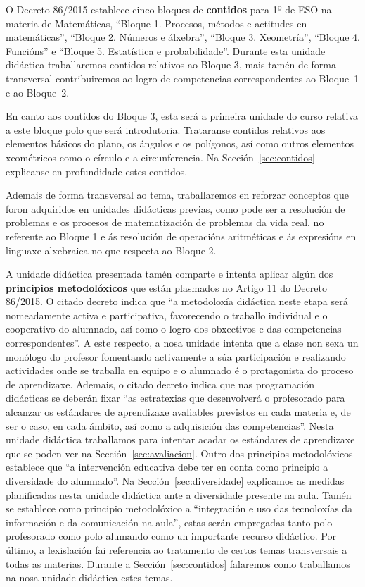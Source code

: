 O Decreto 86/2015 establece cinco bloques de \textbf{contidos} para 1º de ESO na materia de Matemáticas, ``Bloque 1. Procesos, métodos e actitudes en matemáticas'', ``Bloque 2. Números e álxebra'', ``Bloque 3. Xeometría'', ``Bloque 4. Funcións'' e ``Bloque 5. Estatística e probabilidade''. Durante esta unidade didáctica traballaremos contidos relativos ao Bloque 3, mais tamén de forma transversal contribuiremos ao logro de competencias correspondentes ao Bloque~1 e ao Bloque~2.

En canto aos contidos do Bloque 3, esta será a primeira unidade do curso relativa a este bloque polo que será introdutoria. Trataranse contidos relativos aos elementos básicos do plano, os ángulos e os polígonos, así como outros elementos xeométricos como o círculo e a circunferencia. Na Sección~\ref{sec:contidos} explicanse en profundidade estes contidos.

Ademais de forma transversal ao tema, traballaremos en reforzar conceptos que foron adquiridos en unidades didácticas previas, como pode ser a resolución de problemas e os procesos de matematización de problemas da vida real, no referente ao Bloque 1 e ás resolución de operacións aritméticas e ás expresións en linguaxe alxebraica no que respecta ao Bloque 2.

A unidade didáctica presentada tamén comparte e intenta aplicar algún dos \textbf{principios metodolóxicos} que están plasmados no Artigo 11 do Decreto 86/2015. O citado decreto indica que ``a metodoloxía didáctica neste etapa será nomeadamente activa e participativa, favorecendo o traballo individual e o cooperativo do alumnado, así como o logro dos obxectivos e das competencias correspondentes''. A este respecto, a nosa unidade intenta que a clase non sexa un monólogo do profesor fomentando activamente a súa participación e realizando actividades onde se traballa en equipo e o alumnado é o protagonista do proceso de aprendizaxe. Ademais, o citado decreto indica que nas programación didácticas se deberán fixar ``as estratexias que desenvolverá o profesorado para alcanzar os estándares de aprendizaxe avaliables previstos en cada materia e, de ser o caso, en cada ámbito, así como a adquisición das competencias''. Nesta unidade didáctica traballamos para intentar acadar os estándares de aprendizaxe que se poden ver na Sección~\ref{sec:avaliacion}. Outro dos principios metodolóxicos establece que ``a intervención educativa debe ter en conta como principio a diversidade do alumnado''. Na Sección~\ref{sec:diversidade} explicamos as medidas planificadas nesta unidade didáctica ante a diversidade presente na aula. Tamén se establece como principio metodolóxico a ``integración e uso das tecnoloxías da información e da comunicación na aula'', estas serán empregadas tanto polo profesorado como polo alumando como un importante recurso didáctico. Por último, a lexislación fai referencia ao tratamento de certos temas transversais a todas as materias. Durante a Sección~\ref{sec:contidos} falaremos como traballamos na nosa unidade didáctica estes temas.

